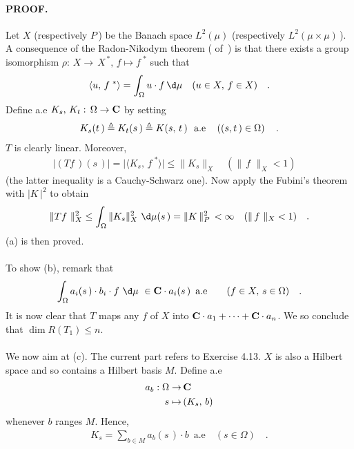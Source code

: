 \paragraph{PROOF.} Let $X$ (respectively $P\,$) be the Banach space $L^2(\mu)$ (respectively $L^2(\mu\times \mu)\,$). A consequence of the Radon-Nikodym theorem ( of \cite{Big_Rudin}\,) is that there exists a group isomorphism $\rho:\, X\to \, X^{\,\ast},\, f\mapsto f^{\,\,\ast}$ such that
\begin{align}
\langle u ,\, f^{\,\,\ast}  \rangle =\int_\Omega u\cdot f \, \d\mu  \quad (u\in X,\, f\in X)\quad .
\end{align}
Define a.e $K_s,\, K_t:\, \Omega\to {\mathbf C}$ by setting
\begin{align}
K_s(t\,)\triangleq K_t(s\,)\triangleq  K(s,\, t\,)\, \, \text{ a.e}\quad \left((s,t\,)\in \Omega\right)\quad .
\end{align}
$T$ is clearly linear. Moreover, 
\begin{align}
\lvert (T f\,)(s\,) \rvert = \lvert \langle K_s,\, f^{\,\,\ast} \rangle \rvert \leq \| K_s\|_X\quad(\|\,f\,\,\|_X < 1) \quad
\end{align}
(the latter inequality is a Cauchy-Schwarz one). Now apply the Fubini's theorem with $\lvert K\,\rvert^2$ to obtain
\begin{align}
\|Tf\,\,\|^2_X \leq \int_\Omega \| K_s\|^2_X \, \,\d \mu (s\,)  =\| K\,\|_P^2 \,< \infty \quad(\|\,f\,\,\|_X < 1)\quad  .
\end{align}
(a) is then proved. \\
\\
To show (b), remark that
\begin{align}
\int_\Omega a_i (s\,) \cdot b_i \cdot f  \,\,\d\mu \,\,\in \C\cdot  a_i(s\,)\,\,\,\text{a.e}\quad \quad (f\in X, \, s\in \Omega)  \quad.
\end{align}
It is now clear that $T$ maps any $f$ of $X$ into ${\mathbf C} \cdot a_1+\dotsb+ {\mathbf C}\cdot a_n$. We so conclude that $\dim R(T_1)\leq n $. \\
\\
We now aim at (c). The current part refers to Exercise 4.13. $X$ is also a Hilbert space and so contains a Hilbert basis $M$. Define a.e
\begin{align}
a_b: \Omega \to &\,{\mathbf C}   \\
 s \mapsto &\,(K_s,\, b) \nonumber
\end{align}
whenever $b$ ranges $M$. Hence,
\begin{align}
K_s= \sum_{b\in M} a_b(s\,) \cdot b \, \text{ a.e} \quad (s\in \Omega) \quad.
\end{align}
